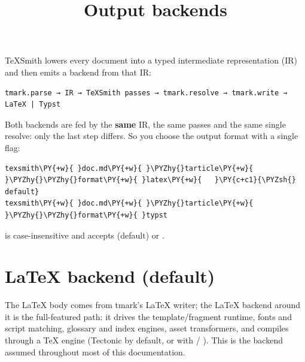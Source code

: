 \documentclass[a4paper,twoside]{article}
\title{Output backends}
\author{}\date{}
\begin{document}
\maketitle
TeXSmith lowers every document into a typed intermediate representation (IR)
and then emits a backend from that IR:
\begin{tscode}[lang=text, engine=pygments]
\begin{Verbatim}[commandchars=\\\{\},breaklines, breakanywhere, commandchars=\\\{\}]
tmark.parse → IR → TeXSmith passes → tmark.resolve → tmark.write → LaTeX | Typst
\end{Verbatim}
\end{tscode}
Both backends are fed by the \textbf{same} IR, the same passes and the same single
resolve: only the last step differs. So you choose the output format with a
single flag:
\begin{tscode}[lang=bash, engine=pygments]
\begin{Verbatim}[commandchars=\\\{\},breaklines, breakanywhere, commandchars=\\\{\}]
texsmith\PY{+w}{ }doc.md\PY{+w}{ }\PYZhy{}tarticle\PY{+w}{ }\PYZhy{}\PYZhy{}format\PY{+w}{ }latex\PY{+w}{   }\PY{c+c1}{\PYZsh{} default}
texsmith\PY{+w}{ }doc.md\PY{+w}{ }\PYZhy{}tarticle\PY{+w}{ }\PYZhy{}\PYZhy{}format\PY{+w}{ }typst
\end{Verbatim}
\end{tscode}
 is case-insensitive and accepts  (default) or .
\section{\LaTeX{} backend (default)}
The \LaTeX{} body comes from tmark's \LaTeX{} writer; the \LaTeX{} backend around it is
the full-featured path: it drives the template/fragment runtime, fonts and
script matching, glossary and index engines, asset transformers, and compiles
through a \TeX{} engine
(Tectonic by default, or  with  / ). This is the backend assumed throughout most of this documentation.
\end{document}
